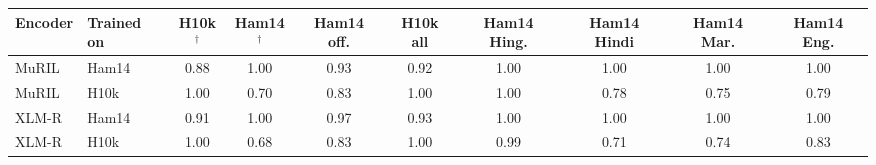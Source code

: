 \begin{tabular}{llcccccccc}
\toprule
Encoder & Trained on & H10k$^\dagger$ & Ham14$^\dagger$ & Ham14 off. & H10k all & Ham14 Hing. & Ham14 Hindi & Ham14 Mar. & Ham14 Eng. \\
\midrule
MuRIL & Ham14 & 0.88 & 1.00 & 0.93 & 0.92 & 1.00 & 1.00 & 1.00 & 1.00 \\
MuRIL & H10k & 1.00 & 0.70 & 0.83 & 1.00 & 1.00 & 0.78 & 0.75 & 0.79 \\
XLM-R & Ham14 & 0.91 & 1.00 & 0.97 & 0.93 & 1.00 & 1.00 & 1.00 & 1.00 \\
XLM-R & H10k & 1.00 & 0.68 & 0.83 & 1.00 & 0.99 & 0.71 & 0.74 & 0.83 \\
\bottomrule
\end{tabular}
